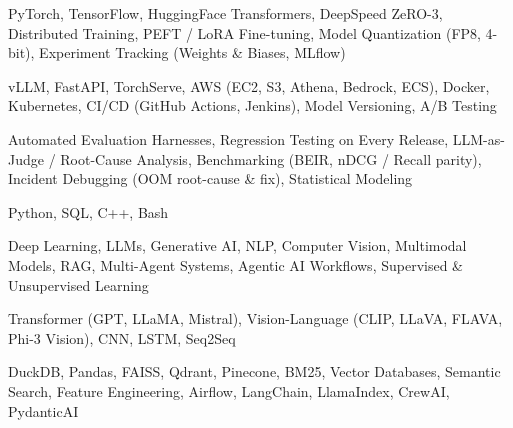 \documentclass[letter,10pt]{article}
\begin{document}
 PyTorch, TensorFlow, HuggingFace Transformers, DeepSpeed ZeRO-3, Distributed Training, PEFT / LoRA Fine-tuning, Model Quantization (FP8, 4-bit), Experiment Tracking (Weights \& Biases, MLflow)\par\vspace{2pt}

 vLLM, FastAPI, TorchServe, AWS (EC2, S3, Athena, Bedrock, ECS), Docker, Kubernetes, CI/CD (GitHub Actions, Jenkins), Model Versioning, A/B Testing\par\vspace{2pt}

 Automated Evaluation Harnesses, Regression Testing on Every Release, LLM-as-Judge / Root-Cause Analysis, Benchmarking (BEIR, nDCG / Recall parity), Incident Debugging (OOM root-cause \& fix), Statistical Modeling\par\vspace{2pt}

 Python, SQL, C++, Bash\par\vspace{2pt}

 Deep Learning, LLMs, Generative AI, NLP, Computer Vision, Multimodal Models, RAG, Multi-Agent Systems, Agentic AI Workflows, Supervised \& Unsupervised Learning\par\vspace{2pt}

 Transformer (GPT, LLaMA, Mistral), Vision-Language (CLIP, LLaVA, FLAVA, Phi-3 Vision), CNN, LSTM, Seq2Seq\par\vspace{2pt}

 DuckDB, Pandas, FAISS, Qdrant, Pinecone, BM25, Vector Databases, Semantic Search, Feature Engineering, Airflow, LangChain, LlamaIndex, CrewAI, PydanticAI
\end{document}

